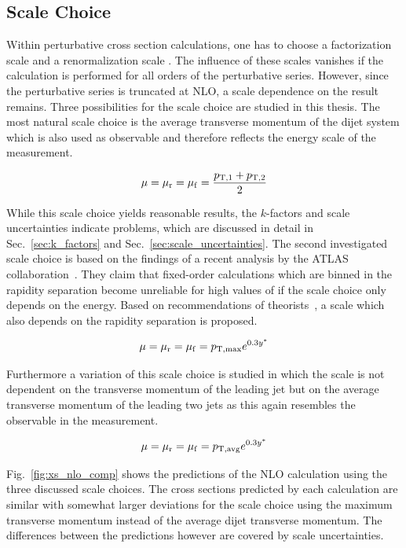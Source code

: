 \subsection{Scale Choice}
\label{sec:scale_coice}

Within perturbative cross section calculations, one has to choose a
factorization scale \muf and a renormalization scale \mur. The influence of
these scales vanishes if the calculation is performed for all orders of the
perturbative series. However, since the perturbative series is truncated at
NLO, a scale dependence on the result remains. Three possibilities for the scale
choice are studied in this thesis.  The most natural scale choice is the average
transverse momentum  of the dijet system which is also used as observable and
therefore reflects the energy scale of the measurement.

\begin{equation*}
    \mu = \mu_{\mathrm{r}} = \mu_{\mathrm{f}} = \frac{p_{\mathrm{T},1} + p_{\mathrm{T},2}}{2}
\end{equation*}

While this scale choice yields reasonable results, the $k$-factors and scale
uncertainties indicate problems, which are discussed in detail in
Sec.~\ref{sec:k_factors} and Sec.~\ref{sec:scale_uncertainties}. The second
investigated scale choice is based on the findings of a recent analysis by the
ATLAS collaboration~\cite{Aad:2011fc}. They claim that fixed-order calculations
which are binned in the rapidity separation \ystar become  unreliable for high
values of \ystar if the scale choice only depends on the energy. Based on
recommendations of theorists~\cite{Ellis:1992en}, a scale which also depends on
the rapidity separation is proposed.

\begin{equation*}
    \mu = \mu_{\mathrm{r}} = \mu_{\mathrm{f}} = p_{\mathrm{T,max}} e^{0.3 y^*} 
\end{equation*}

Furthermore a variation of this scale choice is studied in which the scale is not
dependent on the transverse momentum of the leading jet but on the average
transverse momentum of the leading two jets as this again resembles the
observable in the measurement.

\begin{equation*}
    \mu = \mu_{\mathrm{r}} = \mu_{\mathrm{f}} = p_{\mathrm{T,avg}} e^{0.3 y^*} 
\end{equation*}

Fig.~\ref{fig:xs_nlo_comp} shows the predictions of the NLO calculation using
the three discussed scale choices. The cross sections predicted by each
calculation are similar with somewhat larger deviations for the scale choice using the
maximum transverse momentum instead of the average dijet transverse momentum.
The differences between the predictions however are covered by scale
uncertainties.

